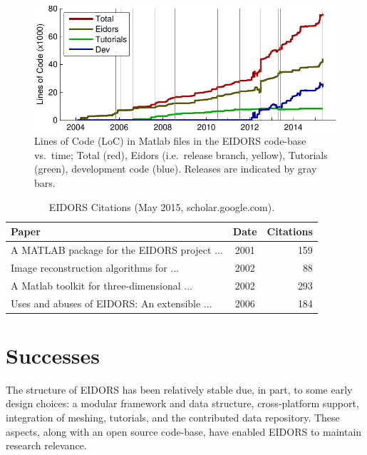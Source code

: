 \documentclass[10pt,a4paper]{article}
\begin{document}
\begin{multicols}{2}
\begin{figure}[H]
  \vspace{-2.5mm}
\centering
\includegraphics[width=.96\columnwidth]{fig_loc.pdf}
\caption{\label{fig:loc}%
  Lines of Code (LoC) in Matlab files in the EIDORS code-base vs.\ time; Total
   (red), Eidors (i.e.\ release branch, yellow), Tutorials (green), development code (blue).
   Releases are indicated by gray bars.
}
\end{figure}
\vspace{-1.5em}
\begin{table}[H]
  \footnotesize
\centering
\caption{\label{tbl:cite} EIDORS Citations
 (May 2015, scholar.google.com).
}
\begin{tabular}{lcr}
  \toprule
  Paper & Date & \hspace{-2mm}Citations \\
  \midrule
  \cite{vauhkonen2001} A MATLAB package for the EIDORS project {\tiny ...}  
    & 2001 & 159 \\
  \cite{polydorides2002phd} Image reconstruction algorithms for {\tiny ...}  
    & 2002 & 88 \\
  \cite{polydorides2002matlab} A Matlab toolkit for three-dimensional {\tiny ...}  
    & 2002 & 293 \\
  \cite{adler2006} Uses and abuses of {EIDORS}: An extensible {\tiny ...} 
    & 2006 & 184 \\
  \bottomrule
\end{tabular}
\vspace{-1em}
\end{table}

\section{Successes}
The structure of EIDORS has been relatively stable due, in part, to some early design choices:
a modular framework and data structure,
cross-platform support, integration of meshing,
tutorials, and the contributed data repository.
These aspects, along with an open source code-base, have enabled EIDORS to
maintain research relevance.


\end{multicols}
\end{document}

